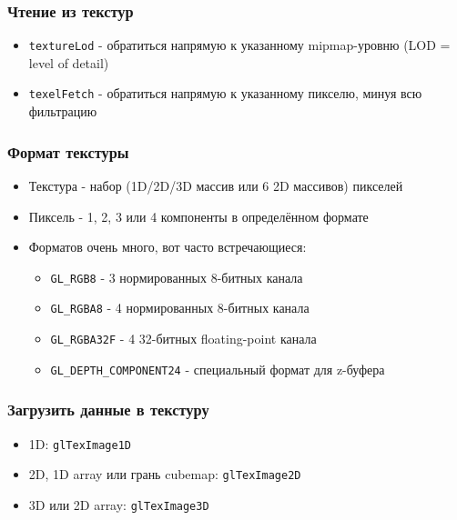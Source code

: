 \documentclass{beamer}
\begin{document}
\begin{frame}[fragile]
\frametitle{Чтение из текстур}
\begin{itemize}
\item \verb|textureLod| - обратиться напрямую к указанному mipmap-уровню (LOD = level of detail)
\pause
\item \verb|texelFetch| - обратиться напрямую к указанному пикселю, минуя всю фильтрацию
\end{itemize}
\end{frame}

\begin{frame}[fragile]
\frametitle{Формат текстуры}
\begin{itemize}
\item Текстура - набор (1D/2D/3D массив или 6 2D массивов) пикселей
\pause
\item Пиксель - 1, 2, 3 или 4 компоненты в определённом формате
\pause
\item Форматов очень много, вот часто встречающиеся:
\begin{itemize}
\item \verb|GL_RGB8| - 3 нормированных 8-битных канала
\item \verb|GL_RGBA8| - 4 нормированных 8-битных канала
\item \verb|GL_RGBA32F| - 4 32-битных floating-point канала
\item \verb|GL_DEPTH_COMPONENT24| - специальный формат для z-буфера
\end{itemize}
\end{itemize}
\end{frame}

\begin{frame}[fragile]
\frametitle{Загрузить данные в текстуру}
\begin{itemize}
\item 1D: \verb|glTexImage1D|
\pause
\item 2D, 1D array или грань cubemap: \verb|glTexImage2D|
\pause
\item 3D или 2D array: \verb|glTexImage3D|
\end{itemize}
\end{frame}
\end{document}
